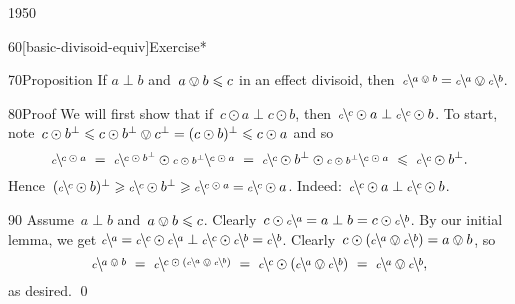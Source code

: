 \begin{parsec}{1950}
\begin{point}{60}[basic-divisoid-equiv]{Exercise*}
\end{point}
\begin{point}{70}{Proposition}%
If $a \perp b$ and~$a \ovee b \leq c$ in an effect divisoid,
then~$\rfrac{a \ovee b}{c } = \rfrac{a}{c} \ovee \rfrac{b}{c}$.
\begin{point}{80}{Proof}%
We will first show that if~$c \odot a \perp c \odot b$,
    then~$\rfrac{c}{c} \odot a \perp \rfrac{c}{c}\odot b$.
To start,
    note~$c \odot b^\perp \leq c \odot b^\perp \ovee c^\perp
        = (c \odot b)^\perp \leq c \odot a$
        and so
\begin{equation*}
     \rfrac{c \odot a}{c} 
     \ = \ 
            \rfrac{c \odot b^\perp}{c} \odot
            \rfrac{c \odot a}{c \odot b^\perp}
     \ = \ 
            \rfrac{c}{c} \odot b^\perp \odot
            \rfrac{c \odot a}{c \odot b^\perp}
    \ \leq \ \rfrac{c}{c} \odot b^\perp.
\end{equation*}
Hence~$(\rfrac{c}{c}\odot b)^\perp
            \geq \rfrac{c}{c} \odot b^\perp
            \geq \rfrac{c \odot a}{c}
            = \rfrac{c}{c} \odot a $.
    Indeed:~$\rfrac{c}{c}\odot a \perp \rfrac{c}{c} \odot b$.
\begin{point}{90}%
Assume~$a\perp b$ and~$a\ovee b \leq c$. 
Clearly~$c \odot \rfrac{a}{c}  = a \perp b = c \odot \rfrac{b}{c}$.
By our initial lemma, we get
    $\rfrac{a}{c } =
    \rfrac{c}{c} \odot \rfrac{a}{c} \perp
    \rfrac{c}{c} \odot \rfrac{b}{c} =
    \rfrac{b}{c }
$.
Clearly~$c \odot (\rfrac{a}{c} \ovee \rfrac{b}{c}) = a \ovee b$, so
\begin{equation*}
    \rfrac{a \ovee b}{c} \ = \  
    \rfrac{c \odot (\rfrac{a}{c} \ovee \rfrac{b}{c})}{c} \ = \ 
\rfrac{c}{c} \odot (\rfrac{a}{c} \ovee \rfrac{b}{c}) \ = \ 
\rfrac{a}{c} \ovee \rfrac{b}{c},
\end{equation*}
as desired. \qed
\end{point}
\end{point}
\end{point}
\end{parsec}

